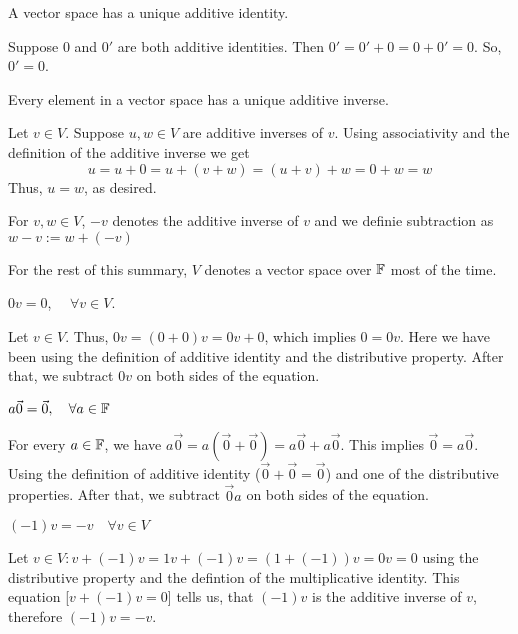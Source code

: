 \setcounter{thm}{25}
\begin{thm} 
  \label{thm: unique additive identity}
  A vector space has a unique additive identity.
\end{thm}
\begin{prf}
  Suppose $0$ and $0'$ are both additive identities. Then $0' = 0'+ 0 = 0 + 0' = 0.$ So, $0' = 0$.
\end{prf}

\begin{thm} 
  Every element in a vector space has a unique additive inverse.
\end{thm}
\begin{prf}
  Let $v\in V.$ Suppose $u,w \in V$ are additive inverses of $v$. Using associativity and the definition of the additive inverse we get
  \begin{equation}
    u = u + 0 = u + (v + w) = (u+v) + w = 0 + w =w
  \end{equation}
  Thus, $u = w$, as desired.
\end{prf}

\begin{mydef}
  For $v,w\in V$, $-v$ denotes the additive inverse of $v$ and we definie subtraction as $w-v := w+(-v)$
\end{mydef}

\begin{mydef}
  For the rest of this summary, $V$ denotes a vector space over $\mathbb{F}$ most of the time.
\end{mydef}

\begin{thm} 
  $0v = 0$, $\quad \forall v\in V$.
\end{thm}
\begin{prf}
  Let $v \in V$. Thus, $0v = (0+0)v = 0v +0$, which implies $0 = 0v$. Here we have been using the definition of additive identity and the distributive property. After that, we subtract $0v$ on both sides of the equation.
\end{prf}

\begin{thm} 
  $a \vec0= \vec0, \quad \forall a\in \mathbb{F}$
\end{thm}
\begin{prf}
  For every $a \in \mathbb{F}$, we have $a\vec0 = a(\vec0+\vec0) = a\vec0 + a\vec0$. This implies $\vec0 = a\vec0$. Using the definition of additive identity ($\vec0+\vec0=\vec0$) and one of the distributive properties. After that, we subtract $\vec0a$ on both sides of the equation.
\end{prf}

\begin{thm} 
  \label{thm: minus one times a vector}
  $(-1)v = -v \quad \forall v\in V$
\end{thm}
\begin{prf}
  Let $v \in V: v + (-1)v = 1v + (-1)v = (1 + (-1))v = 0v = 0$ using the distributive property and the defintion of the multiplicative identity. This equation [$v+(-1)v=0$] tells us, that $(-1)v$ is the additive inverse of $v$, therefore $(-1)v = -v$.
\end{prf}
